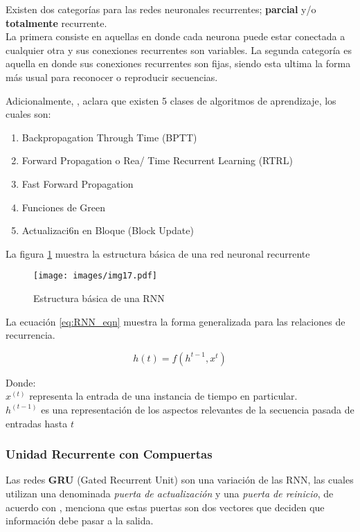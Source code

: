 Existen dos categorías para las redes neuronales recurrentes; \textbf{parcial} y/o \textbf{totalmente} recurrente.\\
La primera consiste en aquellas en donde cada neurona puede estar conectada a cualquier otra y sus conexiones recurrentes son variables.
La segunda categoría es aquella en donde sus conexiones recurrentes son fijas, siendo esta ultima la forma más usual para reconocer o reproducir secuencias.

Adicionalmente, \citep[p. 51]{bib22}, aclara que existen 5 clases de algoritmos de aprendizaje, los cuales son:
\begin{enumerate}
    \item Backpropagation Through Time (BPTT)
    \item Forward Propagation o Rea/ Time Recurrent Learning (RTRL)
    \item Fast Forward Propagation
    \item Funciones de Green
    \item Actualizaci6n en Bloque (Block Update)
\end{enumerate}

La figura \ref{fig:RNN} muestra la estructura básica de una red neuronal recurrente

\begin{figure}[!h]
    \texttt{[image: images/img17.pdf]}
    \caption{Estructura básica de una RNN}
    \label{fig:RNN}
\end{figure}

La ecuación \ref{eq:RNN_eqn} muestra la forma generalizada para las relaciones de recurrencia.

\begin{equation}
    h(t) = f(h^{t-1}, x^t)
    \label{eq:RNN_eqn}
\end{equation}

Donde:\\
$x^{(t)}$ representa la entrada de una instancia de tiempo en particular.\\
$h^{(t-1)}$ es una representación de los aspectos relevantes de la secuencia pasada de entradas hasta $t$

    \subsubsection{Unidad Recurrente con Compuertas}
    Las redes \textbf{GRU} (Gated Recurrent Unit) son una variación de las RNN, las cuales utilizan una denominada \textit{puerta de actualización} y una \textit{puerta de reinicio}, de acuerdo con \citep[p. 20]{bib23}, menciona que estas puertas son dos vectores que deciden que información debe pasar a la salida.

